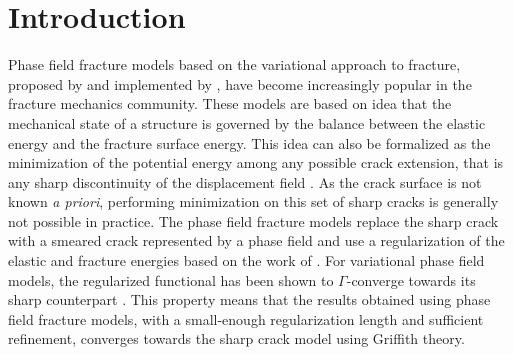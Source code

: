 \documentclass[OptSoft]{jtcam_preprint}
\begin{document}

\section{Introduction}

Phase field fracture models based on the variational approach to fracture, proposed by \textcite{francfort_revisiting_1998} and implemented by \textcite{bourdin_numerical_2000}, have become increasingly popular in the fracture mechanics community.
These models are based on \textcite{griffith_phenomena_1920} idea that the mechanical state of a structure is governed by the balance between the elastic energy and the fracture surface energy.
This idea can also be formalized as the minimization of the potential energy among any possible crack extension, that is any sharp discontinuity of the displacement field \parencite{francfort_revisiting_1998}.
As the crack surface is not known \emph{a priori}, performing minimization on this set of sharp cracks is generally not possible in practice. 
The phase field fracture models replace the sharp crack with a smeared crack represented by a phase field and use a regularization of the elastic and fracture energies based on the work of \textcite{ambrosio_approximation_1990, ambrosio_approximation_1992}.
For variational phase field models, the regularized functional has been shown to $\Gamma$-converge towards its sharp counterpart \parencite{bellettini_discrete_1994, bourdin_image_1999, giacomini_discontinuous_2003, chambolle_approximation_2004}.
This property means that the results obtained using phase field fracture models, with a small-enough regularization length and sufficient refinement, converges towards the sharp crack model using Griffith theory.
\end{document}
